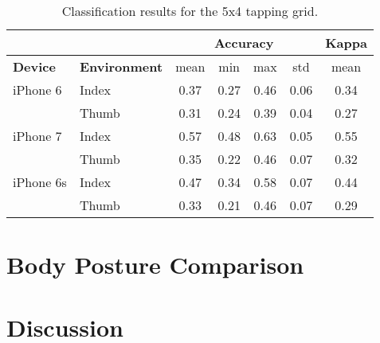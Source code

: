 \begin{table}[h!]
  \centering
\begin{tabular}{|l|l|c|c|c|c|c|}
  \cline{3-7}
  \multicolumn{2}{c}{} & \multicolumn{4}{|c|}{\textbf{Accuracy}} & \textbf{Kappa} \\
  \hline
  \textbf{Device} & \textbf{Environment} & mean &   min &   max  & std &  mean \\
  \hline
  iPhone 6 & Index &      0.37 &     0.27 &     0.46 &     0.06 &        0.34 \\
  & Thumb &      0.31 &     0.24 &     0.39 &     0.04 &        0.27 \\
  \hline
iPhone 7 & Index &      0.57 &     0.48 &     0.63 &     0.05 &        0.55 \\
  & Thumb &      0.35 &     0.22 &     0.46 &     0.07 &        0.32 \\
  \hline
iPhone 6s & Index &      0.47 &     0.34 &     0.58 &     0.07 &        0.44 \\
  & Thumb &      0.33 &     0.21 &     0.46 &     0.07 &        0.29 \\
  \hline
\end{tabular}
  \caption{Classification results for the 5x4 tapping grid.}
\end{table}

\section{Body Posture Comparison}



\section{Discussion}
